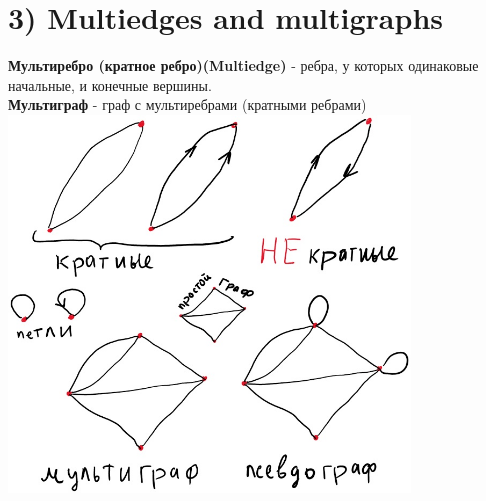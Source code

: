\documentclass[../TM3-UltraDoc.tex]{subfiles}
\begin{document}
	\section*{3) Multiedges and multigraphs}
	\textbf{Мультиребро (кратное ребро)(Multiedge)} - ребра, у которых одинаковые начальные, и конечные вершины.\\
	\textbf{Мультиграф} - граф с мультиребрами (кратными ребрами)\\
	
	\includegraphics[width = 0.8\textwidth]{2.1}
\end{document}
